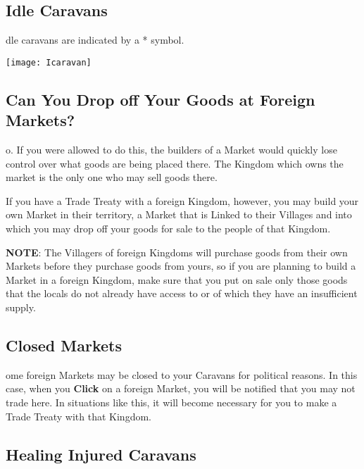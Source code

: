 \subsection{\textsf{Idle Caravans}}

dle caravans are indicated by a * symbol.

\begin{center}
	\texttt{[image: Icaravan]}
\end{center}

\subsection{\textsf{Can You Drop off Your Goods at Foreign Markets?}}


o. If you were allowed to do this, the builders of a Market would quickly lose control over what goods are being placed there. The Kingdom which owns the market is the only one who may sell goods there.

If you have a Trade Treaty with a foreign Kingdom, however, you may build your own Market in their territory, a Market that is Linked to their Villages and into which you may drop off your goods for sale to the people of that Kingdom.

\textbf{NOTE}: The Villagers of foreign Kingdoms will purchase goods from their own Markets before they purchase goods from yours, so if you are planning to build a Market in a foreign Kingdom, make sure that you put on sale only those goods that the locals do not already have access to or of which they have an insufficient supply.

\subsection{\textsf{Closed Markets}}


ome foreign Markets may be closed to your Caravans for political reasons. In this case, when you \textbf{Click} on a foreign Market, you will be notified that you may not trade here. In situations like this, it will become necessary for you to make a Trade Treaty with that Kingdom.

\subsection{\textsf{Healing Injured Caravans}}

